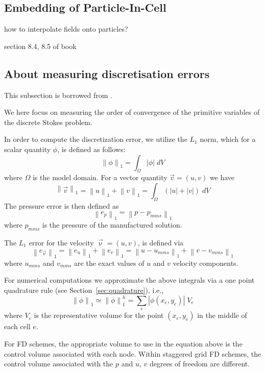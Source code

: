 \subsection{Embedding of Particle-In-Cell}

how to interpolate fields onto particles?

section 8.4, 8.5 of book

\subsection{About measuring discretisation errors}

This subsection is borrowed from  \textcite{dumg11}.

We here focus on
measuring the order of convergence of the primitive
variables of the discrete Stokes problem.

In order to compute the discretization error, we utilize
the $L_1$ norm, which for a scalar quantity $\phi$, is defined as follows:
\[
\left\| \phi \right\|_1 = \int_\Omega |\phi| \; dV
\]
where $\Omega$ is the model domain. For a vector quantity $\vec{v} = (u,v)$ 
we have
\[
\left\| \vec{v} \right\|_1 
= \left\| u \right\|_1 + \left\| v \right\|_1 
= \int_\Omega (|u|+|v|) \; dV
\]
The pressure error is then defined as 
\[
\left\| e_p \right\|_1 = \left\| p - p_{mms}  \right\|_1
\]
where $p_{mms}$ is the pressure of the manufactured solution.

The $L_1$ error for the velocity $\vec\upnu=(u,v)$, is defined via
\[
\left\| e_{\vec\upnu}  \right\|_1 = 
\left\| e_{u}  \right\|_1 +\left\| e_{v}  \right\|_1 = 
\left\| u-u_{mms}  \right\|_1 +\left\| v-v_{mms}  \right\|_1 
\]
where $u_{mms}$ and $v_{mms}$ are the exact values 
of $u$ and $v$ velocity components.

For numerical computations
we approximate the above integrals via a one point
quadrature rule (see Section~\ref{sec:quadrature}), i.e.,
\[
\left\| \phi \right\|_1 \simeq 
\left\| \phi \right\|_1^h = 
\sum_e |\phi(x_e,y_e)| \; V_e
\]
where $V_e$ is the representative volume for the point $(x_e,y_e)$
in the middle of each cell $e$.

For FD schemes, the appropriate volume
to use in the equation above is the control volume associated 
with each node. Within staggered grid FD
schemes, the control volume associated with the $p$ and $u$, $v$ 
degrees of freedom are different.

